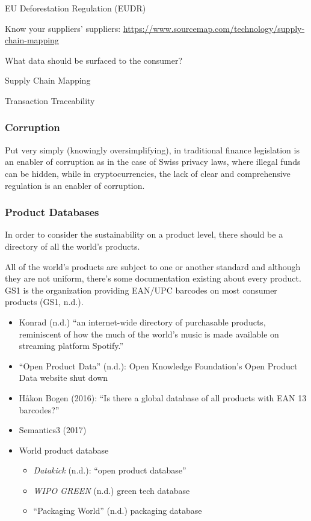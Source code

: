 \documentclass[
  letterpaper,
  DIV=11,
  numbers=noendperiod]{scrartcl}
\begin{document}
EU Deforestation Regulation (EUDR)

Know your suppliers' suppliers:
\url{https://www.sourcemap.com/technology/supply-chain-mapping}

What data should be surfaced to the consumer?

Supply Chain Mapping

Transaction Traceability

\subsubsection{Corruption}\label{corruption}

Put very simply (knowingly oversimplifying), in traditional finance
legislation is an enabler of corruption as in the case of Swiss privacy
laws, where illegal funds can be hidden, while in cryptocurrencies, the
lack of clear and comprehensive regulation is an enabler of corruption.

\subsubsection{Product Databases}\label{product-databases}

In order to consider the sustainability on a product level, there should
be a directory of all the world's products.

All of the world's products are subject to one or another standard and
although they are not uniform, there's some documentation existing about
every product. GS1 is the organization providing EAN/UPC barcodes on
most consumer products (GS1, n.d.).

\begin{itemize}
\item
  Konrad (n.d.) ``an internet-wide directory of purchasable products,
  reminiscent of how the much of the world's music is made available on
  streaming platform Spotify.''
\item
  {``Open {Product Data}''} (n.d.): Open Knowledge Foundation's Open
  Product Data website shut down
\item
  Håkon Bogen (2016): ``Is there a global database of all products with
  EAN 13 barcodes?''
\item
  Semantics3 (2017)
\item
  World product database

  \begin{itemize}
  \item
    \emph{Datakick} (n.d.): ``open product database''
  \item
    \emph{{WIPO GREEN}} (n.d.) green tech database
  \item
    {``Packaging {World}''} (n.d.) packaging database
  \end{itemize}
\end{itemize}
\end{document}
